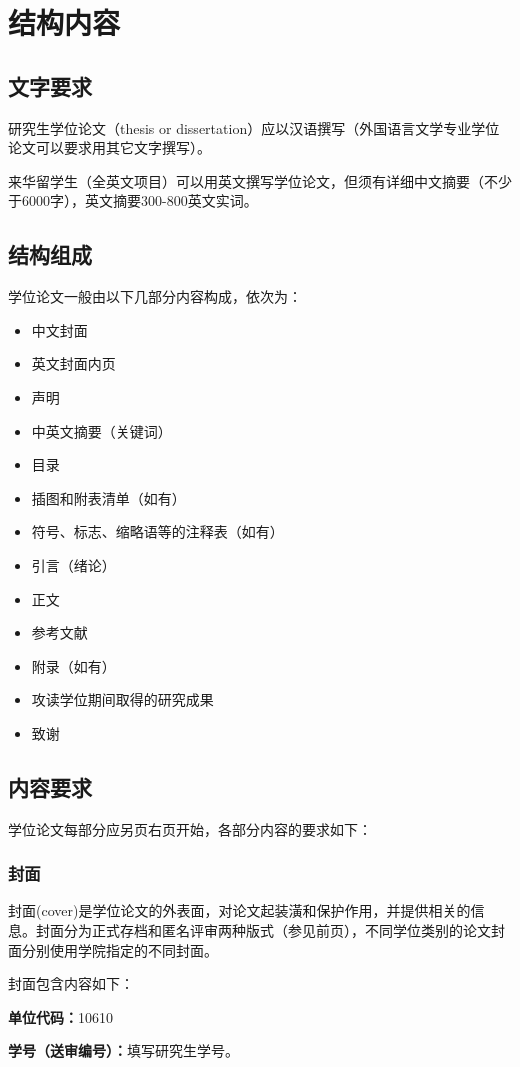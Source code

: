 \chapter{结构内容}
\section{文字要求}
研究生学位论文（thesis or dissertation）应以汉语撰写（外国语言文学专业学位论文可以要求用其它文字撰写）。

来华留学生（全英文项目）可以用英文撰写学位论文，但须有详细中文摘要（不少于6000字），英文摘要300-800英文实词。
\section{结构组成}
学位论文一般由以下几部分内容构成，依次为：

\begin{itemize}
\item	中文封面 
\item	英文封面内页
\item	声明
\item	中英文摘要（关键词） 
\item	目录
\item	插图和附表清单（如有）
\item	符号、标志、缩略语等的注释表（如有）
\item	引言（绪论）
\item	正文
\item	参考文献
\item	附录（如有）
\item	攻读学位期间取得的研究成果
\item	致谢
\end{itemize}
\section{内容要求}
学位论文每部分应另页右页开始，各部分内容的要求如下：
\subsection{封面}
封面(cover)是学位论文的外表面，对论文起装潢和保护作用，并提供相关的信息。封面分为正式存档和匿名评审两种版式（参见前页），不同学位类别的论文封面分别使用学院指定的不同封面。

封面包含内容如下：

\textbf{单位代码：}10610

\textbf{学号（送审编号）：}填写研究生学号。

